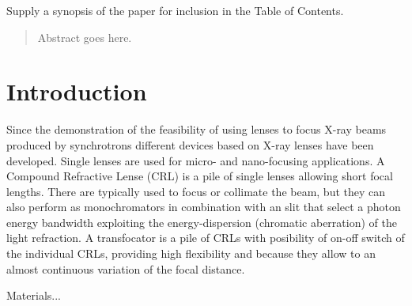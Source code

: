 \documentclass{iucr}              %
\begin{document}
\maketitle                        %

\begin{synopsis}
Supply a synopsis of the paper for inclusion in the Table of Contents.
\end{synopsis}

\begin{abstract}
Abstract goes here.
\end{abstract}



\section{Introduction}

Since the demonstration of the feasibility of using lenses  to focus X-ray beams produced by synchrotrons \cite{Snigirev1996} different devices based on X-ray lenses have been  developed. Single lenses are used for micro- and nano-focusing applications. A Compound Refractive Lense (CRL) is a pile of single lenses allowing short focal lengths. There are typically used to focus or collimate the beam, but they can also perform as monochromators in combination with an slit that select a photon energy bandwidth exploiting the energy-dispersion (chromatic aberration) of the light refraction. A transfocator is a pile of CRLs with posibility of on-off switch of the individual CRLs, providing high flexibility and because they allow to an almost continuous variation of the focal distance. 

Materials...
\end{document}
